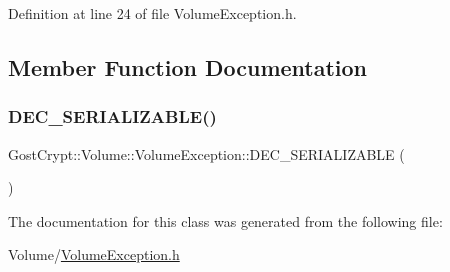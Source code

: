 Definition at line 24 of file Volume\+Exception.\+h.



\subsection{Member Function Documentation}
\mbox{\label{class_gost_crypt_1_1_volume_1_1_volume_exception_a24f9f3cb8bacc0dc9500d9df758a73b6}} 
\subsubsection{\texorpdfstring{D\+E\+C\+\_\+\+S\+E\+R\+I\+A\+L\+I\+Z\+A\+B\+L\+E()}{DEC\_SERIALIZABLE()}}
{\footnotesize\ttfamily Gost\+Crypt\+::\+Volume\+::\+Volume\+Exception\+::\+D\+E\+C\+\_\+\+S\+E\+R\+I\+A\+L\+I\+Z\+A\+B\+LE (\begin{DoxyParamCaption}\item[{\hyperlink{class_gost_crypt_1_1_volume_1_1_volume_exception}{Volume\+Exception}}]{ }\end{DoxyParamCaption})}



The documentation for this class was generated from the following file\+:\begin{DoxyCompactItemize}
\item 
Volume/\hyperlink{_volume_exception_8h}{Volume\+Exception.\+h}\end{DoxyCompactItemize}
